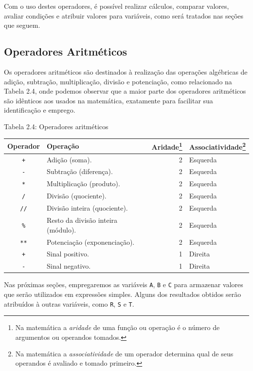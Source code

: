 \documentclass[
]{book}
\begin{document}
Com o uso destes operadores, é possível realizar cálculos, comparar valores, avaliar condições e atribuir valores para variáveis, como será tratados nas seções que seguem.

\hypertarget{comput-opera-aritm}{%
\subsection{Operadores Aritméticos}\label{comput-opera-aritm}}

Os operadores aritméticos são destinados à realização das operações algébricas de adição, subtração, multiplicação, divisão e potenciação, como relacionado na Tabela 2.4, onde podemos observar que a maior parte dos operadores aritméticos são idênticos aos usados na matemática, exatamente para facilitar sua identificação e emprego.

Tabela 2.4: Operadores aritméticos

\begin{longtable}[]{@{}clrl@{}}
\toprule
Operador & Operação & Aridade\footnote{Na matemática a \emph{aridade} de uma função ou operação é o número de argumentos ou operandos tomados.} & Associatividade\footnote{Na matemática a \emph{associatividade} de um operador determina qual de seus operandos é avaliado e tomado primeiro.} \\
\midrule
\endhead
\texttt{+} & Adição (soma). & 2 & Esquerda \\
\texttt{-} & Subtração (diferença). & 2 & Esquerda \\
\texttt{*} & Multiplicação (produto). & 2 & Esquerda \\
\texttt{/} & Divisão (quociente). & 2 & Esquerda \\
\texttt{//} & Divisão inteira (quociente). & 2 & Esquerda \\
\texttt{\%} & Resto da divisão inteira (módulo). & 2 & Esquerda \\
\texttt{**} & Potenciação (exponenciação). & 2 & Esquerda \\
\texttt{+} & Sinal positivo. & 1 & Direita \\
\texttt{-} & Sinal negativo. & 1 & Direita \\
\bottomrule
\end{longtable}

Nas próximas seções, empregaremos as variáveis \texttt{A}, \texttt{B} e \texttt{C} para armazenar valores que serão utilizados em expressões simples. Alguns dos resultados obtidos serão atribuídos à outras variáveis, como \texttt{R}, \texttt{S} e \texttt{T}.
\end{document}
